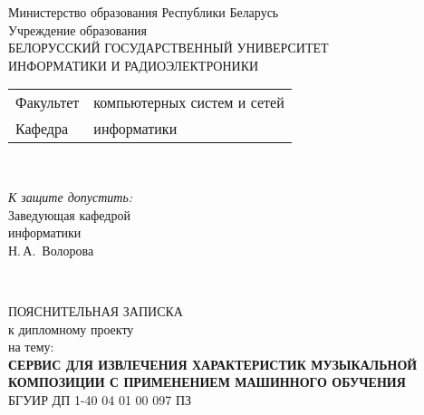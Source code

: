\begin{titlepage}
  \begin{center}
    Министерство образования Республики Беларусь\\[1em]
    Учреждение образования\\
    БЕЛОРУССКИЙ ГОСУДАРСТВЕННЫЙ УНИВЕРСИТЕТ \\
    ИНФОРМАТИКИ И РАДИОЭЛЕКТРОНИКИ\\[1em]

    \begin{minipage}{\textwidth}
      \begin{flushleft}
        \begin{tabular}{ l l }
          Факультет & компьютерных систем и сетей\\
          Кафедра   & информатики
        \end{tabular}
      \end{flushleft}
    \end{minipage}\\[1em]

    \begin{flushright}
      \begin{minipage}{0.4\textwidth}
        \textit{К защите допустить:}\\[0.8em]
        Заведующая кафедрой\\ информатики\\[0.45em]
        \underline{\hspace*{2.8cm}} Н.\,А.~Волорова
      \end{minipage}\\[2.2em]
    \end{flushright}

    {ПОЯСНИТЕЛЬНАЯ ЗАПИСКА}\\
    {к дипломному проекту}\\
    {на тему:}\\[1em]
    \textbf{\large СЕРВИС ДЛЯ ИЗВЛЕЧЕНИЯ ХАРАКТЕРИСТИК МУЗЫКАЛЬНОЙ КОМПОЗИЦИИ С ПРИМЕНЕНИЕМ МАШИННОГО ОБУЧЕНИЯ}\\[1em]


    {БГУИР ДП 1-40 04 01 00 097 ПЗ}\\[2em]


\end{center}
\end{titlepage}
